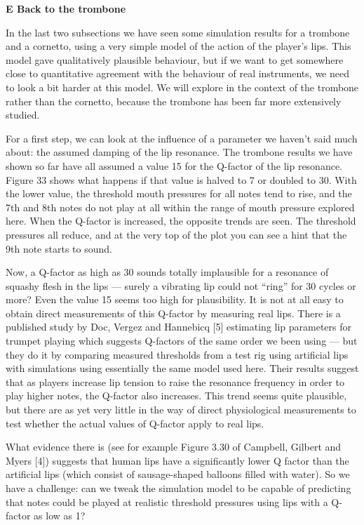   \textbf{E Back to the trombone} 

  In the last two subsections we have seen some simulation results for a 
  trombone and a cornetto, using a very simple model of the action of the 
  player’s lips. This model gave qualitatively plausible behaviour, but if we 
  want to get somewhere close to quantitative agreement with the behaviour of 
  real instruments, we need to look a bit harder at this model. We will explore 
  in the context of the trombone rather than the cornetto, because the trombone 
  has been far more extensively studied. 

  For a first step, we can look at the influence of a parameter we haven’t said 
  much about: the assumed damping of the lip resonance. The trombone results we 
  have shown so far have all assumed a value 15 for the Q-factor of the lip 
  resonance. Figure 33 shows what happens if that value is halved to 7 or 
  doubled to 30. With the lower value, the threshold mouth pressures for all 
  notes tend to rise, and the 7th and 8th notes do not play at all within the 
  range of mouth pressure explored here. When the Q-factor is increased, the 
  opposite trends are seen. The threshold pressures all reduce, and at the very 
  top of the plot you can see a hint that the 9th note starts to sound. 

  Now, a Q-factor as high as 30 sounds totally implausible for a resonance of 
  squashy flesh in the lips --- surely a vibrating lip could not ``ring'' for 
  30 cycles or more? Even the value 15 seems too high for plausibility. It is 
  not at all easy to obtain direct measurements of this Q-factor by measuring 
  real lips. There is a published study by Doc, Vergez and Hannebicq [5] 
  estimating lip parameters for trumpet playing which suggests Q-factors of the 
  same order we been using — but they do it by comparing measured thresholds 
  from a test rig using artificial lips with simulations using essentially the 
  same model used here. Their results suggest that as players increase lip 
  tension to raise the resonance frequency in order to play higher notes, the 
  Q-factor also increases. This trend seems quite plausible, but there are as 
  yet very little in the way of direct physiological measurements to test 
  whether the actual values of Q-factor apply to real lips. 

  What evidence there is (see for example Figure 3.30 of Campbell, Gilbert and 
  Myers [4]) suggests that human lips have a significantly lower Q factor than 
  the artificial lips (which consist of sausage-shaped balloons filled with 
  water). So we have a challenge: can we tweak the simulation model to be 
  capable of predicting that notes could be played at realistic threshold 
  pressures using lips with a Q-factor as low as 1? 

